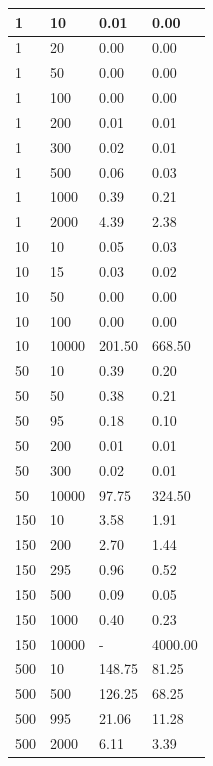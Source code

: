\begin{table}[h]
\begin{tabular}{llll}
1  &       10  &      0.01  &    0.00 \\\hline
1  &       20  &      0.00  &    0.00 \\\hline
1  &       50  &      0.00  &    0.00 \\\hline
1  &       100  &     0.00  &    0.00 \\\hline
1  &       200  &     0.01  &    0.01 \\\hline
1  &       300  &     0.02  &    0.01 \\\hline
1  &       500  &     0.06  &    0.03 \\\hline
1  &       1000  &    0.39  &    0.21 \\\hline
1  &       2000  &    4.39  &    2.38 \\\hline
10  &      10  &      0.05  &    0.03 \\\hline
10  &      15  &      0.03  &    0.02 \\\hline
10  &      50  &      0.00  &    0.00 \\\hline
10  &      100  &     0.00  &    0.00 \\\hline
10  &      10000  &   201.50  &  668.50 \\\hline
50  &      10  &      0.39  &    0.20 \\\hline
50  &      50  &      0.38  &    0.21 \\\hline
50  &      95  &      0.18  &    0.10 \\\hline
50  &      200  &     0.01  &    0.01 \\\hline
50  &      300  &     0.02  &    0.01 \\\hline
50  &      10000  &   97.75  &   324.50 \\\hline
150  &     10  &      3.58  &    1.91 \\\hline
150  &     200  &     2.70  &    1.44 \\\hline
150  &     295  &     0.96  &    0.52 \\\hline
150  &     500  &     0.09  &    0.05 \\\hline
150  &     1000  &    0.40  &    0.23 \\\hline
150  &     10000  &   -     &  4000.00   \\ \hline
500  &     10  &      148.75  &  81.25 \\\hline
500  &     500  &     126.25  &  68.25 \\\hline
500  &     995  &     21.06  &   11.28 \\\hline
500  &     2000  &    6.11  &    3.39 \\\hline

\end{tabular}
\end{table}
